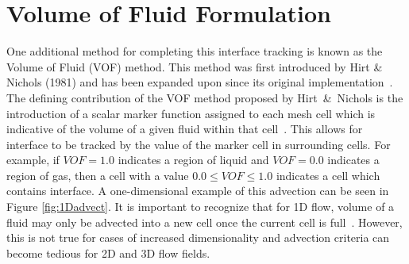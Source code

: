 \section{Volume of Fluid Formulation}
One additional method for completing this interface tracking is known as the Volume of Fluid (VOF) method. This method was first introduced by Hirt \& Nichols (1981) and has been expanded upon since its original implementation~\cite{Hirt1981,TRYG}. The defining contribution of the VOF method proposed by Hirt~\&~Nichols is the introduction of a scalar marker function assigned to each mesh cell which is indicative of the volume of a given fluid within that cell~\cite{Hirt1981}. This allows for interface to be tracked by the value of the marker cell in surrounding cells. For example, if $VOF = 1.0$ indicates a region of liquid and $VOF = 0.0$ indicates a region of gas, then a cell with a value $0.0 \leq VOF \leq 1.0$ indicates a cell which contains interface. A one-dimensional example of this advection can be seen in Figure \ref{fig:1Dadvect}. It is important to recognize that for 1D flow, volume of a fluid may only be advected into a new cell once the current cell is full~\cite{TRYG}. However, this is not true for cases of increased dimensionality and advection criteria can become tedious for 2D and 3D flow fields. 
